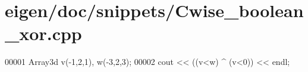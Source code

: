\hypertarget{eigen_2doc_2snippets_2_cwise__boolean__xor_8cpp_source}{}\section{eigen/doc/snippets/\+Cwise\+\_\+boolean\+\_\+xor.cpp}
\label{eigen_2doc_2snippets_2_cwise__boolean__xor_8cpp_source}

\begin{DoxyCode}
00001 Array3d v(-1,2,1), w(-3,2,3);
00002 cout << ((v<w) ^ (v<0)) << endl;
\end{DoxyCode}
